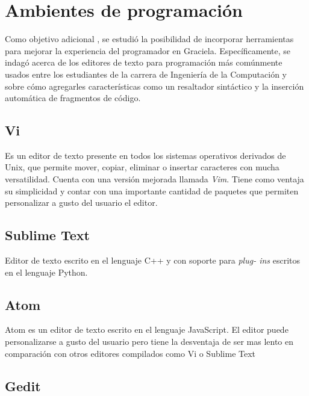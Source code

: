 \section{Ambientes de programación}

Como objetivo adicional , se estudió la posibilidad de
incorporar herramientas para mejorar la experiencia del programador en Graciela.
Específicamente, se indagó acerca de los editores de texto para programación más
comúnmente usados entre los estudiantes de la carrera de Ingeniería de la
Computación y sobre cómo agregarles características como un resaltador
sintáctico y la inserción automática de fragmentos de código.

\subsection{Vi}

Es un editor de texto presente en todos los sistemas operativos derivados de
Unix, que  permite mover, copiar, eliminar o insertar caracteres con mucha
versatilidad. Cuenta con una versión mejorada llamada \textit{Vim}. Tiene como
ventaja su simplicidad y contar con una importante cantidad de paquetes que
permiten personalizar a gusto del usuario el editor.

\subsection{Sublime Text}

Editor de texto escrito en el lenguaje C++ y con soporte para \textit{plug-
ins} escritos en el lenguaje Python. 

\subsection{Atom}

Atom es un editor de texto escrito en el lenguaje JavaScript. El editor puede
personalizarse a gusto del usuario pero tiene la desventaja de ser mas lento
en comparación con otros editores compilados como Vi o Sublime Text

\subsection{Gedit}

